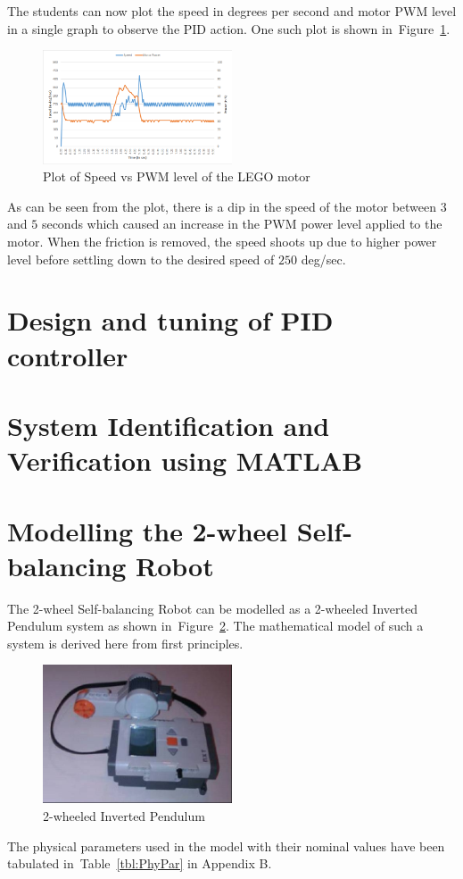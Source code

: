 \documentclass[a4paper,10pt]{article}
\begin{document}
The students can now plot the speed in degrees per second and motor PWM level in a single graph to observe the PID action. One such plot is shown in~Figure~\ref{fig:PIDplot}.

\begin{figure}[!hbp]
	\includegraphics[width=0.5\textwidth]{PIDplot}
	\caption{Plot of Speed vs PWM level of the LEGO motor}
	\label{fig:PIDplot}
\end{figure}

As can be seen from the plot, there is a dip in the speed of the motor between $3$ and $5$ seconds which caused an increase in the PWM power level applied to the motor. When the friction is removed, the speed shoots up due to higher power level before settling down to the desired speed of $250$ deg/sec.

\section{Design and tuning of PID controller}

\section{System Identification and Verification using MATLAB}

\section{Modelling the 2-wheel Self-balancing Robot}
The 2-wheel Self-balancing Robot can be modelled as a 2-wheeled Inverted Pendulum system as shown in~Figure~\ref{fig:InvPen}. The mathematical model of such a system is derived here from first principles. 
\begin{figure}[!hbp]
	\includegraphics[width=0.5\textwidth]{InvPen}
	\caption{2-wheeled Inverted Pendulum}
	\label{fig:InvPen}
\end{figure}
The physical parameters used in the model with their nominal values have been tabulated in~Table~\ref{tbl:PhyPar} in Appendix B.
\end{document}
